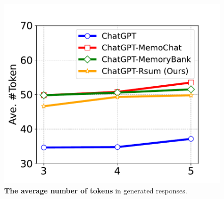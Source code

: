 \documentclass[authoryear,preprint,review,12pt]{elsarticle}
\begin{document}
\begin{figure}[t]
\begin{minipage}[t]{0.46\textwidth}
 \includegraphics[scale=0.4]{ave_resp_tokens.pdf}
 \caption{\textbf{The average number of tokens} 
 in generated responses.}
 \label{fig:ave_tokens}
 \end{minipage}
 \end{figure}
\end{document}
